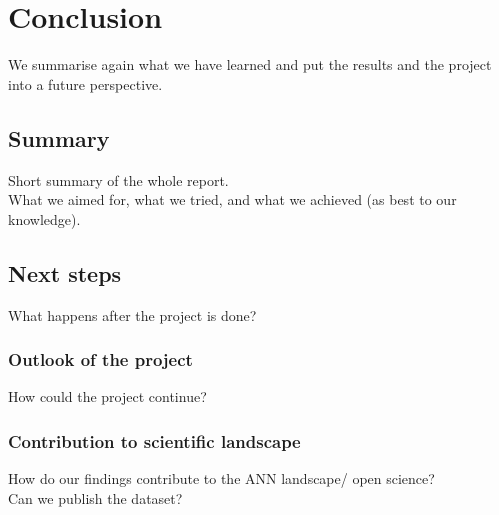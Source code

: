 \section{Conclusion}

We summarise again what we have learned and put the results and the project into a future perspective.

\subsection{Summary}

Short summary of the whole report. \\
What we aimed for, what we tried, and what we achieved (as best to our knowledge). \\

\subsection{Next steps}

What happens after the project is done?

\subsubsection{Outlook of the project}

How could the project continue? \\

\subsubsection{Contribution to scientific landscape}

How do our findings contribute to the ANN landscape/ open science? \\
Can we publish the dataset?

